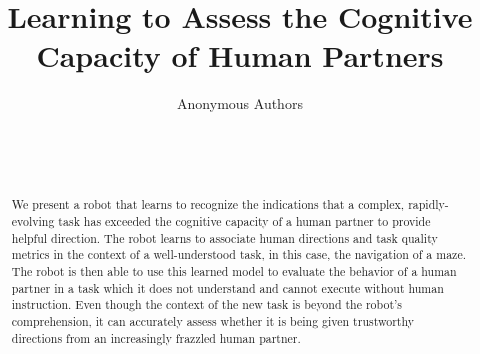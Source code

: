 \documentclass{sig-alternate}
\begin{document}
\title{Learning to Assess the Cognitive Capacity of Human Partners}


\author{
%
\alignauthor
Anonymous Authors\\
        \\
        \\
        \\
}

\maketitle
\begin{abstract} 
We present a robot that learns to recognize the indications that a
complex, rapidly-evolving task has exceeded the cognitive capacity of
a human partner to provide helpful direction.  The robot learns to
associate human directions and task quality metrics in the context of
a well-understood task, in this case, the navigation of a maze.  The
robot is then able to use this learned model to evaluate the behavior
of a human partner in a task which it does not understand and cannot
execute without human instruction.  Even though the context of the new
task is beyond the robot's comprehension, it can accurately assess
whether it is being given trustworthy directions from an increasingly
frazzled human partner.
\end{abstract}
\end{document}
